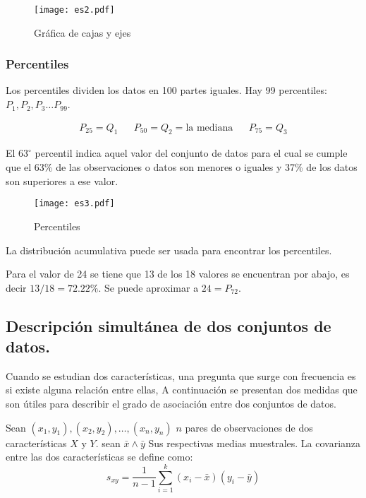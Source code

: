 \begin{figure}[h!]
    \centering
    \texttt{[image: es2.pdf]}
    \caption{Gráfica de cajas y ejes}
\end{figure}

\subsubsection{Percentiles}

Los percentiles dividen los datos en 100 partes iguales. Hay 99 percentiles: $P_1, P_2, P_3\dots P_99$.

\begin{align*}
    P_{25}=Q_1 &  & P_{50}=Q_2=\text{la mediana} &  & P_{75}=Q_3
\end{align*}

El $63^{\circ}$ percentil indica aquel valor del conjunto de
datos para el cual se cumple que el 63\% de las
observaciones o datos son menores o iguales y
37\% de los datos son superiores a ese valor.

\begin{figure}[h!]
    \centering
    \texttt{[image: es3.pdf]}
    \caption{Percentiles}
\end{figure}

La distribución acumulativa puede ser usada para encontrar
los percentiles.


Para el valor de 24 se tiene que 13 de los 18 valores se encuentran por abajo, es decir $13/18 = 72.22\%$. Se puede aproximar a $24=P_{72}$.

\subsection{Descripción simultánea de dos conjuntos de datos.}

Cuando se estudian dos características, una pregunta que
surge con frecuencia es si existe alguna relación entre ellas,
A continuación se presentan dos medidas que son útiles para
describir el grado de asociación entre dos conjuntos de datos.

\begin{definition}[Covarianza $S_{xy}$]
    Sean $(x_1,y_1),(x_2,y_2),\dots,(x_n,y_n)$ $n$ pares de observaciones de dos características $X$ y $Y$. sean $\bar{x}\land \bar{y}$ Sus respectivas medias muestrales.
    La covarianza entre las dos características se define como:
    \begin{equation}
        s_{xy}=\frac{1}{n-1} \sum_{i=1}^{k}\left(x_i-\bar{x}\right)\left(y_i-\bar{y}\right)
    \end{equation}
\end{definition}

